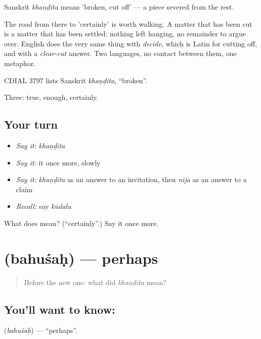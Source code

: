 Sanskrit \emph{khaṇḍita} means 'broken, cut off' — a piece severed from the rest.

The road from there to 'certainly' is worth walking. A matter that has been cut is a matter that has been settled: nothing left hanging, no remainder to argue over. English does the very same thing with \emph{decide}, which is Latin for cutting off, and with a \emph{clear-cut} answer. Two languages, no contact between them, one metaphor.

CDIAL 3797 lists Sanskrit \emph{khaṇḍita}, \textquotedblleft{}broken\textquotedblright{}.

\begin{grammarlens}[title={What you've built}]
Three: true, enough, certainly.
\end{grammarlens}

\subsection*{Your turn}
\begin{itemize}
\raggedright
  \item \emph{Say it:} \emph{khaṇḍita}
  \item \emph{Say it:} it once more, slowly
  \item \emph{Say it:} \emph{khaṇḍita} as an answer to an invitation, then \emph{nija} as an answer to a claim
  \item \emph{Recall:} say \emph{kūdalu}
\end{itemize}

\begin{tcolorbox}[breakable,colback=teal!4,colframe=teal!35!black,title={Before you move on}]
What does  mean? (\textquotedblleft{}certainly\textquotedblright{}.) Say it once more.
\end{tcolorbox}
\section[\texorpdfstring{\kn{ಬಹುಶಃ} (bahuśaḥ)}{ಬಹುಶಃ (bahuśaḥ)}]{ (bahuśaḥ) — perhaps}

\label{lesson:KA-C49-perhaps}



\begin{quote}
Before the new one: what did \emph{khaṇḍita} mean?
\end{quote}

\subsection*{You'll want to know: }
\textbf{} (\emph{bahuśaḥ}) — \textquotedblleft{}perhaps\textquotedblright{}.

